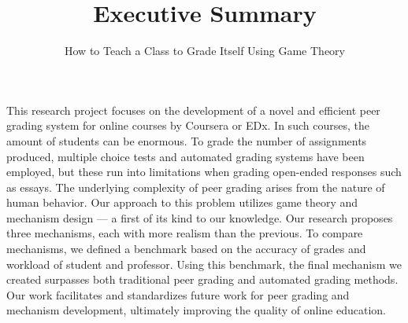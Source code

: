 \documentclass[12pt, Arial]{article}
\title{Executive Summary}
\author{How to Teach a Class to Grade Itself Using Game Theory}
\date{}
\begin{document}
\maketitle
This research project focuses on the development of a novel and efficient peer grading system for online courses by Coursera or EDx. In such courses, the amount of students can be enormous. To grade the number of assignments produced, multiple choice tests and automated grading systems have been employed, but these run into limitations when grading open-ended responses such as essays. The underlying complexity of peer grading arises from the nature of human behavior. Our approach to this problem utilizes game theory and mechanism design --- a first of its kind to our knowledge. Our research proposes three mechanisms, each with more realism than the previous. To compare mechanisms, we defined a benchmark based on the accuracy of grades and workload of student and professor. Using this benchmark, the final mechanism we created surpasses both traditional peer grading and automated grading methods.  Our work facilitates and standardizes future work for peer grading and mechanism development, ultimately improving the quality of online education.
\end{document}
